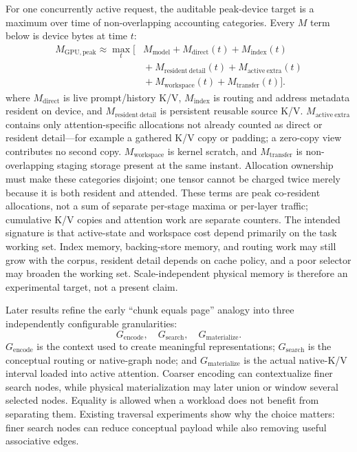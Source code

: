 \documentclass[11pt]{article}
\begin{document}
For one concurrently active request, the auditable peak-device target is a maximum over
time of non-overlapping accounting categories. Every $M$ term below is device bytes at time $t$:
\begin{equation}
\begin{aligned}
M_{\mathrm{GPU,peak}} \approx \max_t\!\bigl[{}
&M_{\mathrm{model}} + M_{\mathrm{direct}}(t) + M_{\mathrm{index}}(t) \\
&{}+ M_{\mathrm{resident\ detail}}(t) + M_{\mathrm{active\ extra}}(t) \\
&{}+ M_{\mathrm{workspace}}(t) + M_{\mathrm{transfer}}(t)\bigr].
\end{aligned}
\end{equation}
where $M_{\mathrm{direct}}$ is live prompt/history K/V, $M_{\mathrm{index}}$ is routing and
address metadata resident on device, and $M_{\mathrm{resident\ detail}}$ is persistent reusable
source K/V. $M_{\mathrm{active\ extra}}$ contains only attention-specific allocations not already
counted as direct or resident detail---for example a gathered K/V copy or padding; a zero-copy
view contributes no second copy. $M_{\mathrm{workspace}}$ is kernel scratch, and
$M_{\mathrm{transfer}}$ is non-overlapping staging storage present at the same instant. Allocation
ownership must make these categories disjoint; one tensor cannot be charged twice merely because
it is both resident and attended. These terms are peak co-resident allocations, not a sum of
separate per-stage maxima or per-layer traffic; cumulative K/V copies and attention work are
separate counters. The intended signature is that active-state and workspace cost
depend primarily on the task working set. Index memory, backing-store memory, and routing
work may still grow with the corpus, resident detail depends on cache policy, and a poor
selector may broaden the working set. Scale-independent physical memory is therefore an
experimental target, not a present claim.

Later results refine the early ``chunk equals page'' analogy into three independently
configurable granularities:
\begin{equation}
G_{\mathrm{encode}},\quad G_{\mathrm{search}},\quad G_{\mathrm{materialize}}.
\end{equation}
$G_{\mathrm{encode}}$ is the context used to create meaningful representations;
$G_{\mathrm{search}}$ is the conceptual routing or native-graph node; and
$G_{\mathrm{materialize}}$ is the actual native-K/V interval loaded into active attention.
Coarser encoding can contextualize finer search nodes, while physical materialization may later
union or window several selected nodes. Equality is allowed when a workload does not benefit
from separating them. Existing traversal experiments show why the choice matters: finer search
nodes can reduce conceptual payload while also removing useful associative edges.
\end{document}
